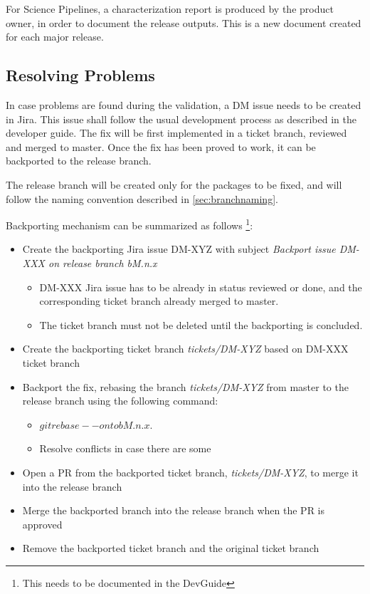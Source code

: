 For Science Pipelines, a characterization report is produced by the product owner, in order to document the release outputs.
This is a new document created for each major release.


\subsection{Resolving Problems}

In case problems are found during the validation, a DM issue needs to be created in Jira.
This issue shall follow the usual development process as described in the developer guide.
The fix will be first implemented in a ticket branch, reviewed and merged to master.
Once the fix has been proved to work, it can be backported to the release branch.

The release branch will be created only for the packages to be fixed, and will follow the naming convention described in \ref{sec:branchnaming}.

Backporting mechanism can be summarized as follows \footnote{This needs to be documented in the DevGuide}:


\begin{itemize}
\item Create the backporting Jira issue DM-XYZ with subject \textit{Backport issue DM-XXX on release branch bM.n.x}
  \begin{itemize}
  \item DM-XXX Jira issue has to be already in status reviewed or done, and the corresponding ticket branch already merged to master.
  \item The ticket branch must not be deleted  until the backporting is concluded.
  \end{itemize}
\item Create the backporting ticket branch \textit{tickets/DM-XYZ}  based on DM-XXX ticket branch
\item Backport the fix, rebasing the branch \textit{tickets/DM-XYZ} from master to the release branch using the following command:
  \begin{itemize}
   \item $git rebase --onto bM.n.x$.
   \item Resolve conflicts in case there are some
  \end{itemize}
\item Open a PR from the backported ticket branch, \textit{tickets/DM-XYZ}, to merge it into the release branch
\item Merge the backported branch into the release branch when the PR is approved
\item Remove the backported ticket branch and the original ticket branch
\end{itemize}

